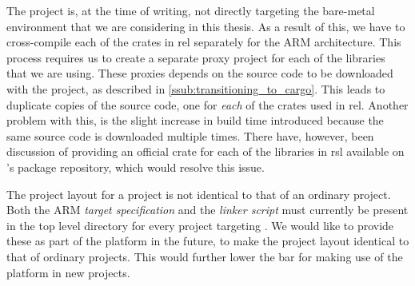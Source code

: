 The {\rust} project is, at the time of writing, not directly targeting the bare-metal environment that we are considering in this thesis.
As a result of this, we have to cross-compile each of the crates in \gls{rel} separately for the ARM architecture.
This process requires us to create a separate proxy project for each of the libraries that we are using.
These proxies depends on the {\rust} source code to be downloaded with the  project, as described in \autoref{ssub:transitioning_to_cargo}.
This leads to duplicate copies of the {\rust} source code, one for \emph{each} of the crates used in \gls{rel}.
Another problem with this, is the slight increase in build time introduced because the same source code is downloaded multiple times.
There have, however, been discussion of providing an official crate for each of the libraries in \gls{rsl} available on {\cargo}'s package repository, which would resolve this issue.

The project layout for a {\rg} project is not identical to that of an ordinary {\rust} project.
Both the ARM \emph{target specification} and the \emph{linker script} must currently be present in the top level directory for every project targeting {\rg}.
We would like to provide these as part of the platform in the future, to make the project layout identical to that of ordinary projects.
This would further lower the bar for making use of the platform in new projects.
